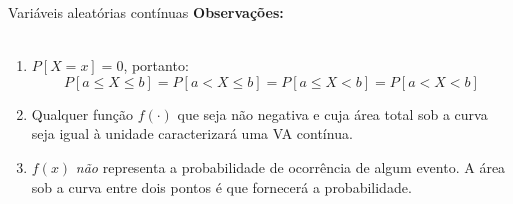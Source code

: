 \documentclass[10pt]{beamer}\usepackage[]{graphicx}\usepackage[]{color}
\providecommand{\E}{\text{E}}
\providecommand{\Var}{\text{Var}}
\theoremstyle{definition}
\begin{document}


\begin{frame}[fragile]{Variáveis aleatórias contínuas}
  \textbf{Observações:} \\~\\
  \begin{enumerate}
  \item $P[X=x] = 0$, portanto:
    \begin{equation*}
    P[a \leq X \leq b] = P[a < X \leq b] =
    P[a \leq X < b] = P[a < X < b]
  \end{equation*}
  \item Qualquer função $f(\cdot)$ que seja não negativa e cuja área
    total sob a curva seja igual à unidade caracterizará uma VA
    contínua.
  \item $f(x)$ \emph{não} representa a probabilidade de ocorrência de
    algum evento. A área sob a curva entre dois pontos é que fornecerá a
    probabilidade.
  \end{enumerate}
\end{frame}
\end{document}
